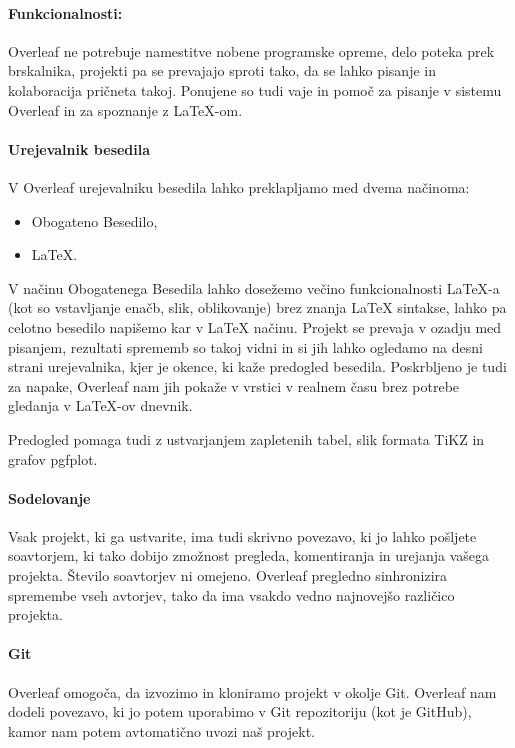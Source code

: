 \documentclass[a4paper, 12pt]{book}
\begin{document}
\paragraph{Funkcionalnosti:\\}
Overleaf ne potrebuje namestitve nobene programske opreme, delo poteka prek brskalnika, projekti pa se prevajajo sproti tako, da se lahko pisanje in kolaboracija pričneta takoj. Ponujene so tudi vaje in pomoč za pisanje v sistemu Overleaf in za spoznanje z {\LaTeX-om}.

\paragraph{Urejevalnik besedila}
V Overleaf urejevalniku besedila lahko preklapljamo med dvema načinoma:
\begin{itemize}
	\item Obogateno Besedilo,
	\item {\LaTeX}.
\end{itemize}
V načinu Obogatenega Besedila lahko dosežemo večino funkcionalnosti {\LaTeX-a} (kot so vstavljanje enačb, slik, oblikovanje) brez znanja {\LaTeX} sintakse, lahko pa celotno besedilo napišemo kar v {\LaTeX} načinu. Projekt se prevaja v ozadju med pisanjem, rezultati sprememb so takoj vidni in si jih lahko ogledamo na desni strani urejevalnika, kjer je okence, ki kaže predogled besedila. Poskrbljeno je tudi za napake, Overleaf nam jih pokaže v vrstici v realnem času brez potrebe gledanja v {\LaTeX-ov} dnevnik.

Predogled pomaga tudi z ustvarjanjem zapletenih tabel, slik formata TiKZ in grafov pgfplot. \cite{102}

\paragraph{Sodelovanje}
Vsak projekt, ki ga ustvarite, ima tudi skrivno povezavo, ki jo lahko pošljete soavtorjem, ki tako dobijo zmožnost pregleda, komentiranja in urejanja vašega projekta. Število soavtorjev ni omejeno. Overleaf pregledno sinhronizira spremembe vseh avtorjev, tako da ima vsakdo vedno najnovejšo različico projekta.

\paragraph{Git}
Overleaf omogoča, da izvozimo in kloniramo projekt v okolje Git. Overleaf nam dodeli povezavo, ki jo potem uporabimo v Git repozitoriju (kot je GitHub), kamor nam potem avtomatično uvozi naš projekt.
\end{document}
